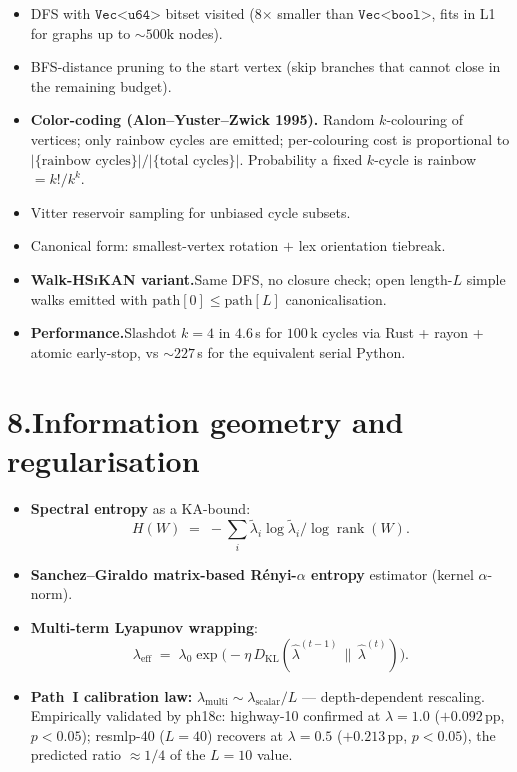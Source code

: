 \documentclass[11pt,a4paper]{article}
\newcommand{\HSiKAN}{\textsc{HSiKAN}}
\begin{document}
\begin{itemize}
\item DFS with $\texttt{Vec<u64>}$ bitset visited (8$\times$ smaller
  than $\texttt{Vec<bool>}$, fits in L1 for graphs up to $\sim
  500\text{k}$ nodes).
\item BFS-distance pruning to the start vertex (skip branches that
  cannot close in the remaining budget).
\item \textbf{Color-coding (Alon--Yuster--Zwick 1995).}\;
  Random $k$-colouring of vertices; only rainbow cycles are
  emitted; per-colouring cost is proportional to
  $|\{\text{rainbow cycles}\}| / |\{\text{total cycles}\}|$.
  Probability a fixed $k$-cycle is rainbow $= k!/k^k$.
\item Vitter reservoir sampling for unbiased cycle subsets.
\item Canonical form: smallest-vertex rotation $+$ lex orientation
  tiebreak.
\item \textbf{Walk-\HSiKAN{} variant.}\;Same DFS, no closure check;
  open length-$L$ simple walks emitted with
  $\mathrm{path}[0] \le \mathrm{path}[L]$ canonicalisation.
\item \textbf{Performance.}\;Slashdot $k{=}4$ in $4.6$\,s for
  $100$\,k cycles via Rust + rayon + atomic early-stop, vs
  $\sim 227$\,s for the equivalent serial Python.
\end{itemize}

\section*{8.\;Information geometry and regularisation}

\begin{itemize}
\item \textbf{Spectral entropy} as a KA-bound:
  \[
    H(W) \;=\; -\sum_i \tilde\lambda_i \log \tilde\lambda_i \big/
                 \log \operatorname{rank}(W).
  \]
\item \textbf{Sanchez--Giraldo matrix-based R\'enyi-$\alpha$
  entropy} estimator (kernel $\alpha$-norm).
\item \textbf{Multi-term Lyapunov wrapping}:
  \[
    \lambda_{\text{eff}}
    \;=\; \lambda_0 \exp\!\big(
      -\eta\, D_{\mathrm{KL}}(\hat\lambda^{(t-1)} \,\|\, \hat\lambda^{(t)})
    \big).
  \]
\item \textbf{Path~I calibration law:}
  $\lambda_{\text{multi}} \sim \lambda_{\text{scalar}} / L$ ---
  depth-dependent rescaling.  Empirically validated by ph18c:
  highway-10 confirmed at $\lambda{=}1.0$ ($+0.092$\,pp,
  $p<0.05$); resmlp-40 ($L{=}40$) recovers at $\lambda{=}0.5$
  ($+0.213$\,pp, $p<0.05$), the predicted ratio
  $\approx 1/4$ of the $L{=}10$ value.
\end{itemize}
\end{document}
